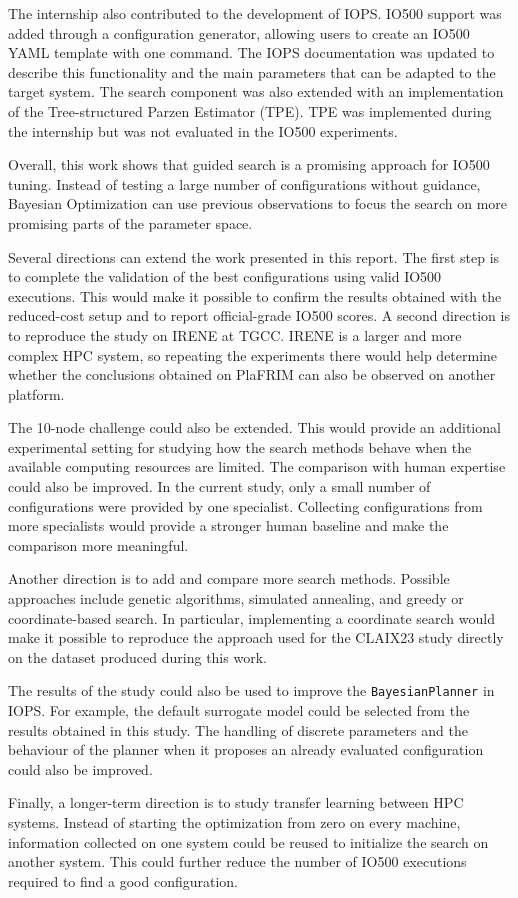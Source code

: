 The internship also contributed to the development of IOPS. IO500 support
was added through a configuration generator, allowing users to create an
IO500 YAML template with one  command. The IOPS documentation was updated to describe this functionality and the
main parameters that can be adapted to the target system. The search
component was also extended with an implementation of the
Tree-structured Parzen Estimator (TPE). TPE was implemented during the
internship but was not evaluated in the IO500 experiments.

Overall, this work shows that guided search is a promising approach for
IO500 tuning. Instead of testing a large number of configurations without
guidance, Bayesian Optimization can use previous observations to focus
the search on more promising parts of the parameter space.



Several directions can extend the work presented in this report. The first step is to complete the validation of the best configurations
using valid IO500 executions. This would make it possible to confirm the
results obtained with the reduced-cost setup and to report official-grade
IO500 scores. A second direction is to reproduce the study on IRENE at TGCC. IRENE is a
larger and more complex HPC system, so repeating the experiments there
would help determine whether the conclusions obtained on PlaFRIM can also
be observed on another platform.

The 10-node challenge could also be extended. This would provide an
additional experimental setting for studying how the search methods behave
when the available computing resources are limited. The comparison with human expertise could also be improved. In the current
study, only a small number of configurations were provided by one
specialist. Collecting configurations from more specialists would provide
a stronger human baseline and make the comparison more meaningful.

Another direction is to add and compare more search methods. Possible
approaches include genetic algorithms, simulated annealing, and
greedy or coordinate-based search. In particular, implementing a
coordinate search would make it possible to reproduce the approach used
for the CLAIX23 study directly on the dataset produced during this work.

The results of the study could also be used to improve the
\texttt{BayesianPlanner} in IOPS. For example, the default surrogate model
could be selected from the results obtained in this study. The handling of
discrete parameters and the behaviour of the planner when it proposes an
already evaluated configuration could also be improved.

Finally, a longer-term direction is to study transfer learning between HPC
systems. Instead of starting the optimization from zero on every machine,
information collected on one system could be reused to initialize the
search on another system. This could further reduce the number of IO500
executions required to find a good configuration.